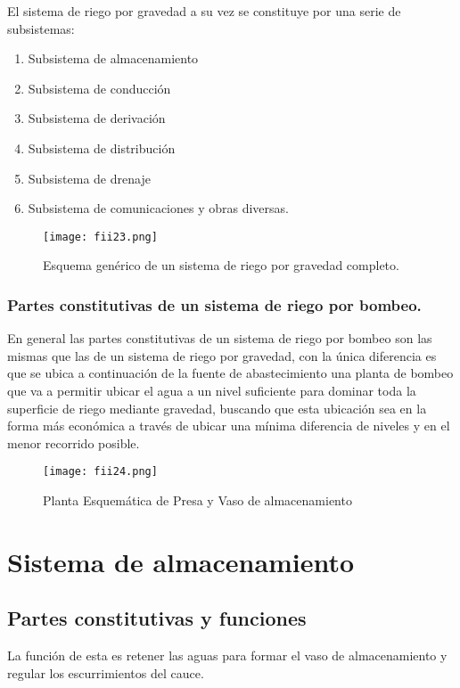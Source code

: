 El sistema de riego por gravedad a su vez se constituye por una serie de
subsistemas:

\begin{enumerate}
	\item Subsistema de almacenamiento
	\item Subsistema de conducción
	\item Subsistema de derivación
	\item Subsistema de distribución
	\item Subsistema de drenaje
	\item Subsistema de comunicaciones y obras diversas.
\end{enumerate}
\begin{figure}[h!]
	\centerline{\texttt{[image: fii23.png]}}
	\caption{Esquema genérico de un sistema de riego por gravedad completo.}
	\label{fii23}
\end{figure}

\subsubsection{Partes constitutivas de un sistema de riego por bombeo.}

En general las partes constitutivas de un sistema de riego por bombeo son las
mismas que las de un sistema de riego por gravedad, con la única diferencia es que se
ubica a continuación de la fuente de abastecimiento una planta de bombeo que va a
permitir ubicar el agua a un nivel suficiente para dominar toda la superficie de riego
mediante gravedad, buscando que esta ubicación sea en la forma más económica a
través de ubicar una mínima diferencia de niveles y en el menor recorrido posible.

\begin{figure}[h!]
	\centerline{\texttt{[image: fii24.png]}}
	\caption{Planta Esquemática de Presa y Vaso de almacenamiento}
	\label{fii24}
\end{figure}

\section{Sistema de almacenamiento}
\subsection{Partes constitutivas y funciones}
\begin{definition}
	La función de esta es retener las aguas para
	formar el vaso de almacenamiento y regular los escurrimientos del cauce.
\end{definition}


